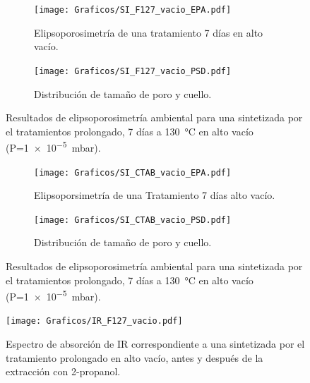 		   \begin{figure}
			  	\begin{subfigure}{0.495\textwidth}
			  	\texttt{[image: Graficos/SI\_F127\_vacio\_EPA.pdf]}
				\caption{Elipsoporosimetría de una \pdmF\space tratamiento 7 días en alto vacío.}
				\label{fig:F127_vacio_EPA}
				\end{subfigure}
				\begin{subfigure}{0.495\textwidth}
			  	\texttt{[image: Graficos/SI\_F127\_vacio\_PSD.pdf]}
				\caption{Distribución de tamaño de poro y cuello.\\ }
				\label{fig:F127_vacio_PSD}
				\end{subfigure}
				\caption[Elipsoporosimetría \pdmF\space tratamiento alto vacío.]{Resultados de elipsoporosimetría ambiental para una \pdmF\space sintetizada por el tratamientos prolongado, 7 días a \SI{130}{\celsius} en alto vacío (P=\SI{1e-5}{\milli\bar}).}
				\end{figure}
		
		  \begin{figure}
		  	\begin{subfigure}{0.495\textwidth}
		  	\texttt{[image: Graficos/SI\_CTAB\_vacio\_EPA.pdf]}
			\caption{Elipsoporsimetría de una \pdmC\space Tratamiento 7 días alto vacío.}
			\label{fig:CTAB_vacio_EPA}
			\end{subfigure}
			\begin{subfigure}{0.495\textwidth}
		  	\texttt{[image: Graficos/SI\_CTAB\_vacio\_PSD.pdf]}
			\caption{Distribución de tamaño de poro y cuello.\\ }
			\label{fig:CTAB_vacio_PSD}
			\end{subfigure}
			\caption[Elipsoporosimetría \pdmC\space tratamiento alto vacío.]{Resultados de elipsoporosimetría ambiental para una \pdmC\space sintetizada por el tratamientos prolongado, 7 días a \SI{130}{\celsius} en alto vacío (P=\SI{1e-5}{\milli\bar}).}
			\end{figure} 	
		
         \begin{figure}
			 	\centering
			 	\texttt{[image: Graficos/IR\_F127\_vacio.pdf]}
			 	\caption[FTIR \pdmF\space tratamiento prolongado.]{Espectro de absorción de IR correspondiente a una \pdmF\space sintetizada por el tratamiento prolongado en alto vacío, antes y después de la extracción con 2-propanol.}
			 	\label{fig:IR_F127_vacio}
			    \end{figure}
					
